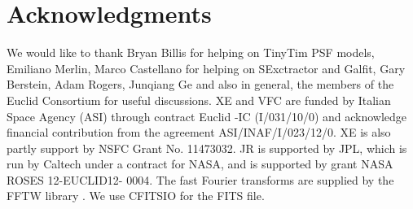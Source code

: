 \documentclass[useAMS,usenatbib]{mn2e}
\begin{document}
%

\section*{Acknowledgments}

We would like to thank Bryan Billis for helping on TinyTim PSF models, Emiliano Merlin, Marco Castellano for helping on SExctractor and Galfit, Gary Berstein, Adam Rogers, Junqiang Ge and also in general, the members of the Euclid Consortium for useful discussions.
XE and VFC are funded by Italian Space Agency (ASI) through contract Euclid -IC (I/031/10/0) and acknowledge financial contribution from the agreement ASI/INAF/I/023/12/0. XE is also partly support by NSFC Grant No. 11473032. JR is supported by JPL, which is run by Caltech under a contract for NASA, and is supported by grant NASA ROSES 12-EUCLID12- 0004. The fast Fourier transforms are supplied by the FFTW library \citep{fftw05}. We use CFITSIO \citep{1999ASPC..172..487P} for the FITS file.

\appendix
\end{document}
